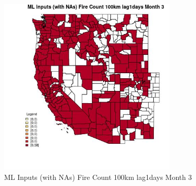 \begin{figure} 
\centering  
\includegraphics[width=0.77\textwidth]{Code_Outputs/Report_ML_input_PM25_Step4_part_e_de_duplicated_aves_compiled_2019-05-21wNAs_CountyFire_Count_100km_lag1daysmedianMonth3.jpg} 
\caption{\label{fig:Report_ML_input_PM25_Step4_part_e_de_duplicated_aves_compiled_2019-05-21wNAsCountyFire_Count_100km_lag1daysmedianMonth3}ML Inputs (with NAs) Fire Count 100km lag1days Month 3} 
\end{figure} 
 
